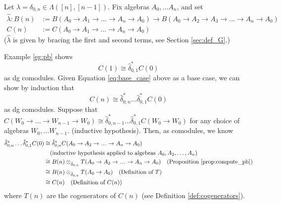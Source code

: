 %
\begin{eg} 
  \label{eg:pb2}
Let $\lambda = \delta_{0,n} \in 
\Lambda([n],[n-1])$. Fix algebras 
$A_0, \dots A_n$, and set
\begin{align*}
\hat{\lambda}: B(n)
&:= B(A_0 \to A_1 \to \dots \to A_n \to A_0) 
  \to B(A_0 \to A_2 \to A_3 \to \dots \to A_n \to A_0)\\
C(n) 
&:= C(A_0 \to A_1 \to \dots \to A_n \to A_0)
\end{align*}
($\hat{\lambda}$ is given by bracing the 
first and second terms, see Section \ref{sec:def_G}.)

Example \ref{eg:pb} shows
\begin{equation} \label{eq:base_case}
C(1) \cong \hat{\delta}_{0,1}^*C(0)
\end{equation}
as dg comodules. Given Equation 
\ref{eq:base_case} above as a base 
case, we can show by induction that 
$$
C(n) \cong \hat{\delta}_{0,n}^*\dots\hat{\delta}_{0,1}^*C(0)
$$ 
as dg comodules. Suppose that 
$C(W_0 \to \dots \to W_{n-1} \to W_0) 
\cong \hat{\delta}_{0,n-1}^* \dots \hat{\delta}_{0,1}^*
C(W_0 \to W_0)$ for any 
choice of algebras $W_0, \dots W_{n-1}$.
(inductive hypothesis). Then, as 
comodules, we know
\begin{align*}
\hat{\delta}_{0,n}^*\dots\hat{\delta}_{0,1}^*C(0)
& \cong
  \hat{\delta}_{0,n}^*C(A_0 \to A_2 \to \smdots \to A_n \to A_0)\\
&  
  \quad \textrm{(inductive hypothesis applied to algebras } 
  A_0, A_2,\dots,A_n)\\
& \cong 
  B(n) \otimes_{\hat{\delta}_{0,n}} 
  T(A_0 \to A_2 \to \smdots \to A_n \to A_0)
  \quad \textrm{(Proposition 
  \ref{prop:compute_pb})}\\
& \cong 
  B(n) \otimes_{\hat{\delta}_{0,n}} 
  T(A_0 \to A_0)
  \quad \textrm{(Definition of $T$)} \\
& \cong 
  C(n)
  \quad \textrm{(Definition of $C(n)$)}
\end{align*}
where $T(n)$ are the cogenerators of 
$C(n)$ (see Definition 
\ref{def:cogenerators}).


\end{eg}
